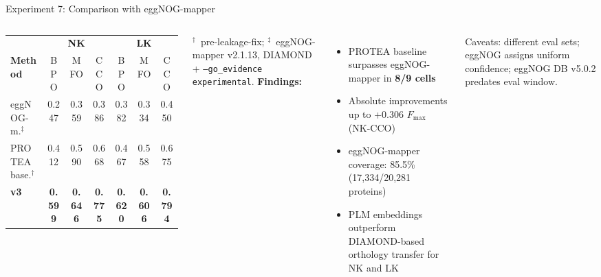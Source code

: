 \documentclass[12pt, aspectratio=169]{beamer}
\newcommand{\fmax}{$F_{\max}$}
\newcommand{\highlight}[1]{\textcolor{proteagreen}{\textbf{#1}}}
\begin{document}
\begin{frame}{Experiment 7: Comparison with eggNOG-mapper}
  \begin{columns}[c]
      \begin{tabular}{l ccc ccc}
        \toprule
        & \multicolumn{3}{c}{\textbf{NK}} & \multicolumn{3}{c}{\textbf{LK}} \\
        \cmidrule(lr){2-4} \cmidrule(lr){5-7}
        \textbf{Method} & BPO & MFO & CCO & BPO & MFO & CCO \\
        \midrule
        eggNOG-m.$^\ddagger$ & 0.247 & 0.359 & 0.386 & 0.382 & 0.334 & 0.450 \\
        PROTEA base.$^\dagger$ & 0.412 & 0.590 & 0.668 & 0.467 & 0.558 & 0.675 \\
        \rowcolor{proteagreen!15}
        \textbf{v3} & \textbf{0.599} & \textbf{0.646} & \textbf{0.775} & \textbf{0.620} & \textbf{0.606} & \textbf{0.794} \\
        \bottomrule
      \end{tabular}
      \vspace{0.3em}
      {\small $^\dagger$~pre-leakage-fix; $^\ddagger$~eggNOG-mapper v2.1.13, DIAMOND + \texttt{--go\_evidence experimental}.}
      \textbf{Findings:}
      \begin{itemize}
        \item PROTEA baseline surpasses eggNOG-mapper in \highlight{8/9 cells}
        \item Absolute improvements up to +0.306 \fmax{} (NK-CCO)
        \item eggNOG-mapper coverage: 85.5\% (17,334/20,281 proteins)
        \item PLM embeddings outperform DIAMOND-based orthology transfer for NK and LK
      \end{itemize}
      \vspace{0.3em}
      {\small Caveats: different eval sets; eggNOG assigns uniform confidence; eggNOG DB v5.0.2 predates eval window.}
  \end{columns}
\end{frame}
\end{document}
